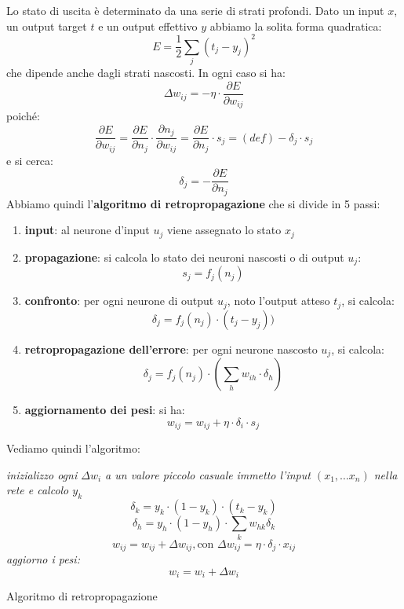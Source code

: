 						Lo stato di uscita è determinato da una serie di strati profondi. Dato un input
						$x$, un output target $t$ e un output effettivo $y$ abbiamo la solita forma
						quadratica:
						\[E=\frac{1}{2}\sum_j(t_j-y_j)^2\]
						che dipende anche dagli strati nascosti. In ogni caso si ha:
						\[\Delta w_{ij}=-\eta\cdot\frac{\partial E}{\partial w_{ij}}\]
						poiché:
						\[\frac{\partial E}{\partial w_{ij}}= \frac{\partial E}{\partial n_{j}}\cdot
							\frac{\partial n_j}{\partial w_{ij}}= \frac{\partial E}{\partial n_{j}}\cdot
							s_j=(def)-\delta_j\cdot s_j\]
							e si cerca:
							\[\delta_j=-\frac{\partial E}{\partial n_{j}}\]
							Abbiamo quindi l'\textbf{algoritmo di retropropagazione} che si divide in 5
							passi:
							\begin{enumerate}
								\item \textbf{input}: al neurone d'input $u_j$ viene assegnato lo stato $x_j$
								        
								\item \textbf{propagazione}: si calcola lo stato dei neuroni nascosti o di
								      output $u_j$:
								      \[s_j=f_j(n_j)\]
								\item \textbf{confronto}: per ogni neurone di output $u_j$, noto l’output
								      atteso $t_j$, si calcola:
								      \[\delta_j=f_j(n_j)\cdot(t_j-y_j))\]
								\item \textbf{retropropagazione dell’errore}: per ogni neurone nascosto $u_j$,
								      si calcola:
								      \[\delta_j=f_j(n_j)\cdot\left(\sum_h w_{ih}\cdot \delta_h\right)\]
								\item \textbf{aggiornamento dei pesi}: si ha:
								      \[w_{ij}=w_{ij}+\eta\cdot \delta_i\cdot s_j\]
							\end{enumerate}
							Vediamo quindi l'algoritmo:
							\begin{algorithm}[H]
								\begin{algorithmic}
									\State \textit{inizializzo ogni $\Delta w_i$ a un valore piccolo casuale}
									\State \textit{immetto l'input $( x_1, \ldots x_n)$ nella rete e calcolo
									$y_k$}  
									\[\delta_k=y_k\cdot(1-y_k)\cdot(t_k-y_k)\]
									\EndFor
									\[\delta_h=y_h\cdot(1-y_h)\cdot\sum_k w_{hk}\delta_k\]
									\EndFor
									\[w_{ij}=w_{ij}+\Delta w_{ij},\mbox{con } \Delta w_{ij}=\eta\cdot\delta_j\cdot x_{ij}\] 
									\EndFor
									\EndFor
									\EndWhile
									\State \textit{aggiorno i pesi:}
									\[w_i=w_i+\Delta w_i\]
									\EndFunction
								\end{algorithmic}
								\caption{Algoritmo di retropropagazione}
							\end{algorithm}

